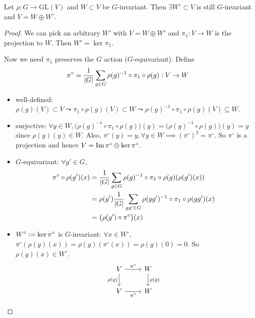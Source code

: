 \begin{theorem}
  Let $\rho: G \to \text{GL}(V)$ and $W \subset V$ be $G$-invariant.
  Then $\exists W^\circ \subset V$ is still $G$-invariant and
  $V = W \oplus W^\circ$.
  \begin{proof}
    We can pick an arbitrary $W'$ with $V = W \oplus W'$ and
    $\pi_1: V \to W$ is the projection to $W$. Then $W' = \ker \pi_1$.

    Now we need $\pi_1$ preserves the $G$ action ($G$-equivariant).
    Define
    \[
      \pi^\circ = \frac{1}{\lvert G\rvert} \sum_{g\in G}
      \rho(g)^{-1} \circ \pi_1 \circ \rho(g) : V \to W
    \]
    \begin{itemize}
      \item well-defined: $\rho(g)(V) \subset V \leadsto
        \pi_1 \circ \rho(g)(V) \subset W \leadsto
        \rho(g)^{-1} \circ \pi_1 \circ \rho(g)(V) \subseteq W$.
      \item surjective: $\forall y \in W,
        \big(\rho(g)^{-1}\circ \pi_1 \circ\rho(g)\big) (y) =
        \big(\rho(g)^{-1} \circ\rho(g)\big) (y) = y$ since
        $\rho(g)(y) \in W$. Also, $\pi^\circ(y) = y, \forall y \in W \implies
        (\pi^\circ)^2 = \pi^\circ$.
        So $\pi^\circ$ is a projection and hence $V = \operatorname{Im} \pi^\circ \oplus \ker \pi^\circ$.
      \item $G$-equivariant: $\forall g' \in G$,
        \begin{align*}
          \pi^\circ \circ \rho(g')(x)
          &= \frac{1}{\lvert G\rvert} \sum_{g\in G}
            \rho(g)^{-1}\circ\pi_1\circ\rho(g) (\rho(g')(x)) \\
          &= \rho(g') \frac{1}{\lvert G\rvert} \sum_{gg'\in G}
            \rho(gg')^{-1}\circ\pi_1\circ\rho(gg')(x) \\
            &= \big(\rho(g') \circ \pi^\circ\big) (x)
        \end{align*}
      \item $W^\circ \vcentcolon= \ker \pi^\circ$ is $G$-invariant:
        $\forall x \in W^\circ$, $\pi^\circ(\rho(g)(x))
        = \rho(g)(\pi^\circ(x)) = \rho(g)(0) = 0$. So
        $\rho(g)(x) \in W^\circ$.
        \[
          \begin{tikzcd}
            V \arrow[d, "\rho(g)"'] \arrow[r, "\pi^\circ"] & W \arrow[d, "\rho(g)"] \\
            V \arrow[r, "\pi^\circ"'] & W
          \end{tikzcd}
          \qedhere
        \]
    \end{itemize}
  \end{proof}
\end{theorem}

